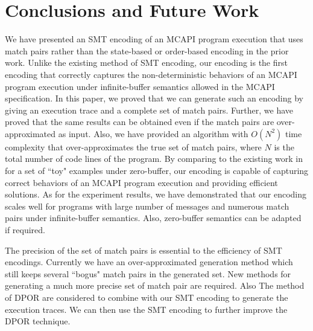 \section{Conclusions and Future Work}
We have presented an SMT encoding of an MCAPI program execution that uses match pairs rather than the state-based or order-based encoding in the prior work. Unlike the existing method of SMT encoding, our encoding is the first encoding that correctly captures the non-deterministic behaviors of an MCAPI program execution under infinite-buffer semantics allowed in the MCAPI specification. In this paper, we proved that we can generate such an encoding by giving an execution trace and a complete set of match pairs. Further, we have proved that the same results can be obtained even if the match pairs are over-approximated as input. Also, we have provided an algorithm with $O(N^2)$ time complexity that over-approximates the true set of match pairs, where $N$ is the total number of code lines of the program. By comparing to the existing work in \cite{elwakil:padtad10} for a set of ``toy" examples under zero-buffer, our encoding is capable of capturing correct behaviors of an MCAPI program execution and providing efficient solutions. As for the experiment results, we have demonstrated that our encoding scales well for programs with large number of messages and numerous match pairs under infinite-buffer semantics. Also, zero-buffer semantics can be adapted if required.

The precision of the set of match pairs is essential to the efficiency of SMT encodings. Currently we have an over-approximated generation method which still keeps several ``bogus" match pairs in the generated set. New methods for generating a much more precise set of match pair are required. Also The method of DPOR are considered to combine with our SMT encoding to generate the execution traces. We can then use the SMT encoding to further improve the DPOR technique.

